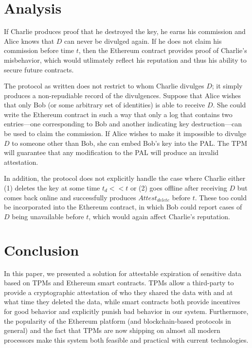 \documentclass{article}
\begin{document}
\section{Analysis}

If Charlie produces proof that he destroyed the key, he earns his commission and Alice knows that $D$ can never be divulged again. If he does not claim his commission before time $t$, then the Ethereum contract provides proof of Charlie's misbehavior, which would utlimately reflect his reputation and thus his ability to secure future contracts.

The protocol as written does not restrict to whom Charlie divulges $D$; it simply produces a non-repudiable record of the divulgences. Suppose that Alice wishes that only Bob (or some arbitrary set of identities) is able to receive $D$. She could write the Ethereum contract in such a way that only a log that contains two entries---one corresponding to Bob and another indicating key destruction---can be used to claim the commission. If Alice wishes to make it impossible to divulge $D$ to someone other than Bob, she can embed Bob's key into the PAL. The TPM will guarantee that any modification to the PAL will produce an invalid attestation.

In addition, the protocol does not explicitly handle the case where Charlie either (1) deletes the key at some time $t_d << t$ or (2) goes offline after receiving $D$ but comes back online and successfully produces $Attest_{delete}$ before $t$. These too could be incorporated into the Ethereum contract, in which Bob could report cases of $D$ being unavailable before $t$, which would again affect Charlie's reputation.

\section{Conclusion}

In this paper, we presented a solution for attestable expiration of sensitive data based on TPMs and Ethereum smart contracts. TPMs allow a third-party to provide a cryptographic attestation of who they shared the data with and at what time they deleted the data, while smart contracts both provide incentives for good behavior and explicitly punish bad behavior in our system. Furthermore, the popularity of the Ethereum platform (and blockchain-based protocols in general) and the fact that TPMs are now shipping on almost all modern processors make this system both feasible and practical with current technologies.



\end{document}
